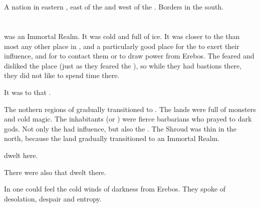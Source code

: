 \section[Thyrin]{\Thyrin}
\index{\Thyrin}
A nation in eastern , east of the  and west of the . 
Borders  in the south. 















\section{\UltimaThule}
\index{\UltimaThule}

\UltimaThule was an Immortal Realm. 
It was cold and full of ice.
It was closer to the \CrystalSphere than most any other place in \Miith, and a particularly good place for the \banelords to exert their influence, and for \Miithians to contact them or to draw power from Erebos.
The \resphain feared and disliked the place (just as they feared the \banelords), so while they had bastions there, they did not like to spend time there. 

It was to \UltimaThule that . 

The nothern regions of \Azmith gradually transitioned to \UltimaThule.
The lands were full of monsters and cold magic.
The inhabitants (\human or \scatha) were fierce barbarians who prayed to dark gods. 
Not only the \banelords had influence, but also the \xs. 
The Shroud was thin in the north, because the land gradually transitioned to an Immortal Realm. 

\Gnomphilim dwelt here. 

There were also \quiljaaran that dwelt there. 

In \UltimaThule one could feel the cold winds of darkness from Erebos.
They spoke of desolation, despair and entropy.

